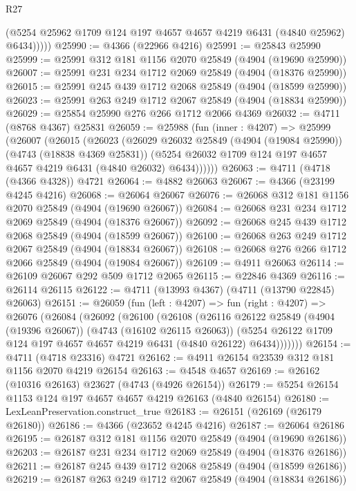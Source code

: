 \begin{lexlean}{R27}
\begin{coremodule}
            (@5254 @25962 @1709 @124 @197 @4657 @4657 @4219 @6431 (@4840 @25962) @6434)))))
@25990 := @4366 (@22966 @4216)
@25991 := @25843 @25990
@25999 := @25991 @312 @181 @1156 @2070 @25849 (@4904 (@19690 @25990))
@26007 := @25991 @231 @234 @1712 @2069 @25849 (@4904 (@18376 @25990))
@26015 := @25991 @245 @439 @1712 @2068 @25849 (@4904 (@18599 @25990))
@26023 := @25991 @263 @249 @1712 @2067 @25849 (@4904 (@18834 @25990))
@26029 := @25854 @25990 @276 @266 @1712 @2066 @4369
@26032 := @4711 (@8768 @4367) @25831
@26059 := @25988
    (fun (inner : @4207) =>
    @25999
      (@26007
        (@26015
          (@26023
            (@26029
              @26032
              @25849
              (@4904 (@19084 @25990))
              (@4743 (@18838 @4369 @25831))
              (@5254 @26032 @1709 @124 @197 @4657 @4657 @4219 @6431 (@4840 @26032) @6434))))))
@26063 := @4711 (@4718 (@4366 @4328)) @4721
@26064 := @4882 @26063
@26067 := @4366 (@23199 @4245 @4216)
@26068 := @26064 @26067
@26076 := @26068 @312 @181 @1156 @2070 @25849 (@4904 (@19690 @26067))
@26084 := @26068 @231 @234 @1712 @2069 @25849 (@4904 (@18376 @26067))
@26092 := @26068 @245 @439 @1712 @2068 @25849 (@4904 (@18599 @26067))
@26100 := @26068 @263 @249 @1712 @2067 @25849 (@4904 (@18834 @26067))
@26108 := @26068 @276 @266 @1712 @2066 @25849 (@4904 (@19084 @26067))
@26109 := @4911 @26063
@26114 := @26109 @26067 @292 @509 @1712 @2065
@26115 := @22846 @4369
@26116 := @26114 @26115
@26122 := @4711 (@13993 @4367) (@4711 (@13790 @22845) @26063)
@26151 := @26059
    (fun (left : @4207) =>
    fun (right : @4207) =>
    @26076
      (@26084
        (@26092
          (@26100
            (@26108
              (@26116
                @26122
                @25849
                (@4904 (@19396 @26067))
                (@4743 (@16102 @26115 @26063))
                (@5254 @26122 @1709 @124 @197 @4657 @4657 @4219 @6431 (@4840 @26122) @6434)))))))
@26154 := @4711 (@4718 @23316) @4721
@26162 := @4911 @26154 @23539 @312 @181 @1156 @2070 @4219 @26154
@26163 := @4548 @4657
@26169 := @26162 (@10316 @26163) @23627 (@4743 (@4926 @26154))
@26179 := @5254 @26154 @1153 @124 @197 @4657 @4657 @4219 @26163 (@4840 @26154)
@26180 := LexLeanPreservation.construct_true
@26183 := @26151 (@26169 (@26179 @26180))
@26186 := @4366 (@23652 @4245 @4216)
@26187 := @26064 @26186
@26195 := @26187 @312 @181 @1156 @2070 @25849 (@4904 (@19690 @26186))
@26203 := @26187 @231 @234 @1712 @2069 @25849 (@4904 (@18376 @26186))
@26211 := @26187 @245 @439 @1712 @2068 @25849 (@4904 (@18599 @26186))
@26219 := @26187 @263 @249 @1712 @2067 @25849 (@4904 (@18834 @26186))

\end{coremodule}
\end{lexlean}
